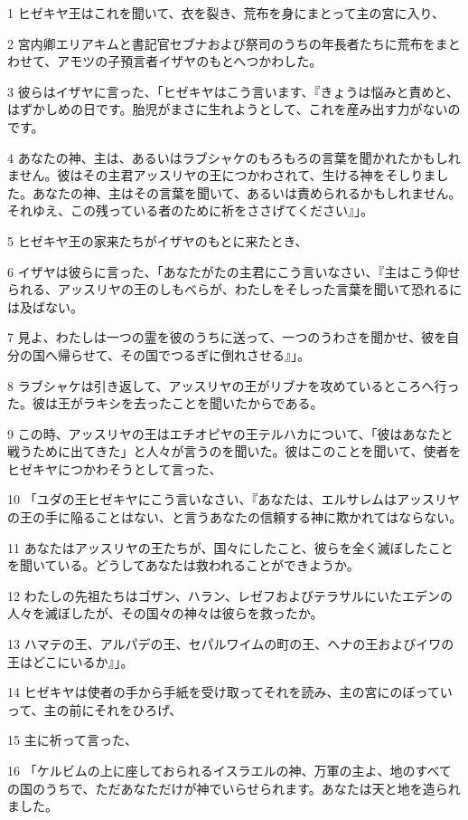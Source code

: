 \par 1 ヒゼキヤ王はこれを聞いて、衣を裂き、荒布を身にまとって主の宮に入り、
\par 2 宮内卿エリアキムと書記官セブナおよび祭司のうちの年長者たちに荒布をまとわせて、アモツの子預言者イザヤのもとへつかわした。
\par 3 彼らはイザヤに言った、「ヒゼキヤはこう言います、『きょうは悩みと責めと、はずかしめの日です。胎児がまさに生れようとして、これを産み出す力がないのです。
\par 4 あなたの神、主は、あるいはラブシャケのもろもろの言葉を聞かれたかもしれません。彼はその主君アッスリヤの王につかわされて、生ける神をそしりました。あなたの神、主はその言葉を聞いて、あるいは責められるかもしれません。それゆえ、この残っている者のために祈をささげてください』」。
\par 5 ヒゼキヤ王の家来たちがイザヤのもとに来たとき、
\par 6 イザヤは彼らに言った、「あなたがたの主君にこう言いなさい、『主はこう仰せられる、アッスリヤの王のしもべらが、わたしをそしった言葉を聞いて恐れるには及ばない。
\par 7 見よ、わたしは一つの霊を彼のうちに送って、一つのうわさを聞かせ、彼を自分の国へ帰らせて、その国でつるぎに倒れさせる』」。
\par 8 ラブシャケは引き返して、アッスリヤの王がリブナを攻めているところへ行った。彼は王がラキシを去ったことを聞いたからである。
\par 9 この時、アッスリヤの王はエチオピヤの王テルハカについて、「彼はあなたと戦うために出てきた」と人々が言うのを聞いた。彼はこのことを聞いて、使者をヒゼキヤにつかわそうとして言った、
\par 10 「ユダの王ヒゼキヤにこう言いなさい、『あなたは、エルサレムはアッスリヤの王の手に陥ることはない、と言うあなたの信頼する神に欺かれてはならない。
\par 11 あなたはアッスリヤの王たちが、国々にしたこと、彼らを全く滅ぼしたことを聞いている。どうしてあなたは救われることができようか。
\par 12 わたしの先祖たちはゴザン、ハラン、レゼフおよびテラサルにいたエデンの人々を滅ぼしたが、その国々の神々は彼らを救ったか。
\par 13 ハマテの王、アルパデの王、セパルワイムの町の王、ヘナの王およびイワの王はどこにいるか』」。
\par 14 ヒゼキヤは使者の手から手紙を受け取ってそれを読み、主の宮にのぼっていって、主の前にそれをひろげ、
\par 15 主に祈って言った、
\par 16 「ケルビムの上に座しておられるイスラエルの神、万軍の主よ、地のすべての国のうちで、ただあなただけが神でいらせられます。あなたは天と地を造られました。
